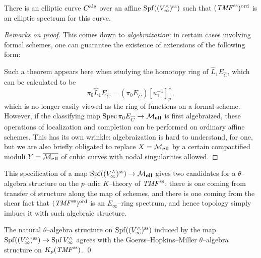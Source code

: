 \begin{lemma}
There is an elliptic curve \(C^{\mathrm{alg}}\) over an affine \(\operatorname{Spf} ((V^\wedge_\infty)^{\mathrm{ss}})\) such that \((\mathit{TMF}^{\mathrm{ss}})^{\mathrm{ord}}\) is an elliptic spectrum for this curve.
\end{lemma}
\begin{proof}[Remarks on proof]
This comes down to \textit{algebraization}: in certain cases involving formal schemes, one can guarantee the existence of extensions of the following form:
\begin{center}
\end{center}
Such a theorem appears here when studying the homotopy ring of \(\widehat L_1 E_{\widehat C}\), which can be calculated to be \[\pi_0 \widehat L_1 E_{\widehat C} = (\pi_0 E_{\widehat C})[u_1^{-1}]^\wedge_p,\] which is no longer easily viewed as the ring of functions on a formal scheme.  However, if the classifying map \(\operatorname{Spec} \pi_0 E_{\widehat C} \to \mathcal{M}_{\mathbf{ell}}\) is first algebraized, these operations of localization and completion can be performed on ordinary affine schemes.  This has its own wrinkle: algebraization is hard to understand, for one, but we are also briefly obligated to replace \(X = \mathcal{M}_{\mathbf{ell}}\) by a certain compactified moduli \(Y = \overline{\mathcal{M}_{\mathbf{ell}}}\) of cubic curves with nodal singularities allowed.
\end{proof}

\noindent This specification of a map \(\operatorname{Spf} ((V^\wedge_\infty)^{\mathrm{ss}}) \to \mathcal{M}_{\mathbf{ell}}\) gives two candidates for a \(\theta\)--algebra structure on the \(p\)--adic \(K\)--theory of \(\mathit{TMF}^{\mathrm{ss}}\): there is one coming from transfer of structure along the map of schemes, and there is one coming from the shear fact that \((\mathit{TMF}^{\mathrm{ss}})^{\mathrm{ord}}\) is an \(E_\infty\)--ring spectrum, and hence topology simply imbues it with such algebraic structure.

\begin{theorem}
The natural \(\theta\)--algebra structure on \(\operatorname{Spf} ((V^\wedge_\infty)^{\mathrm{ss}})\) induced by the map \(\operatorname{Spf} ((V^\wedge_\infty)^{\mathrm{ss}}) \to \operatorname{Spf} V^\wedge_\infty\) agrees with the Goerss--Hopkins--Miller \(\theta\)--algebra structure on \(K_p (\mathit{TMF}^{\mathrm{ss}})\). \qed
\end{theorem}


